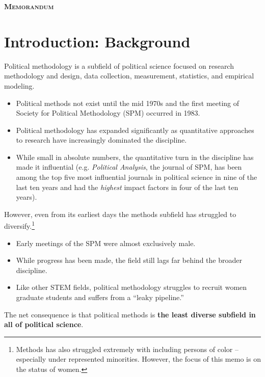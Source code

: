 \documentclass[12pt]{texMemo}
\begin{document}
\newcommand{\stcomp}[1]{{#1}^\complement}

{\begin{center}
\Large\bf
M\textsc{emorandum}
\end{center}}



\maketitle
\singlespacing

\section*{Introduction: Background}

Political methodology is a subfield of political science focused on research methodology and design, data collection, measurement, statistics, and empirical modeling.
\begin{itemize}\setlength\itemsep{0em}
\item Political methods not exist until the mid 1970s and the first meeting of Society for Political Methodology (SPM) occurred in 1983.  
\item Political methodology has expanded significantly as quantitative approaches to research have increasingly dominated the discipline.  
\item While small in absolute numbers, the quantitative turn in the discipline has made it influential (e.g. \textit{Political Analysis}, the journal of SPM, has been among the top five most influential journals in political science in nine of the last ten years and had the \textit{highest} impact factors in four of the last ten years). 
\end{itemize}

\noindent However, even from its earliest days the methods subfield has struggled to diversify.\footnote{Methods has also struggled extremely with including persons of color -- especially under represented minorities.  However, the focus of this memo is on the status of women.}  
\begin{itemize}\setlength\itemsep{0em}
\item Early meetings of the SPM were almost exclusively male. 
\item While progress has been made, the field still lags far behind the broader discipline. 
\item Like other STEM fields, political methodology struggles to recruit women graduate students and suffers from a ``leaky pipeline.'' 
\end{itemize}
 The net consequence is that political methods is \textbf{the least diverse subfield in all of political science}. 
\end{document}
